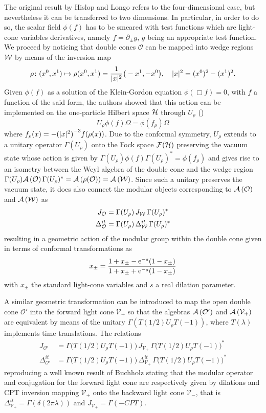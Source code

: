 The original result by Hislop and Longo refers to the 
four-dimensional case, but nevertheless it can be transferred to 
two dimensions. In particular, in order to do so, the scalar
field $\phi(f)$ has to be smeared with test functions 
which are light-cone variables derivatives, namely 
$f=\partial_{\pm} g$, $g$ being an appropriate test 
function. We proceed by noticing that 
double cones $\mathcal{O}$ can be mapped 
into wedge regions $\mathcal{W}$ by means of the inversion map
\[
\rho\colon(x^0,x^1)\mapsto\rho(x^0,x^1)=
\frac{1}{\lvert x\rvert^2}\big(-x^1,-x^0\big),\quad 
\lvert x\rvert^2=(x^0)^2-(x^1)^2.
\]
Given $\phi(f)$ as a solution of the Klein-Gordon equation
$\phi(\Box f)=0$, with $f$ a function of the said form, 
the authors showed that this action can be implemented
on the one-particle Hilbert space $\mathcal{H}$ through $U_{\rho}$
(\cite{HisLon:1982})
\[
U_{\rho}\phi(f)\Omega=\phi(f_{\rho})\Omega
\]
where $f_{\rho}(x)=-{(\lvert x\rvert^2)}^{-3}f(\rho(x))$. Due
to the conformal symmetry, $U_{\rho}$ extends to a unitary
operator $\Gamma(U_{\rho})$ onto the Fock space $\mathcal{F}(\mathcal{H})$ 
preserving the vacuum state whose action is given by
$\Gamma(U_{\rho})\phi(f)\Gamma(U_{\rho})^*=
\phi(f_{\rho})$ and gives rise to 
an isometry between the Weyl algebra of the double cone
and the wedge region $\Gamma(U_{\rho})\mathcal{A}\left(\mathcal{O}\right)
\Gamma(U_{\rho})^*=\mathcal{A}\left(\rho(\mathcal{O})\right)=\mathcal{A}\left(\mathcal{W}\right)$.
Since such a unitary preserves the vacuum state, it does
also connect the modular objects corresponding to
$\mathcal{A}\left(\mathcal{O}\right)$ and $\mathcal{A}\left(\mathcal{W}\right)$ as
\begin{align*}
J_{\mathcal{O}}&=\Gamma(U_{\rho})\,J_{\mathcal{W}}\,\Gamma(U_{\rho})^*\\
\Delta^{it}_{\mathcal{O}}&=\Gamma(U_{\rho})\,\Delta^{it}_{\mathcal{W}}\,
\Gamma(U_{\rho})^*
\end{align*}
resulting in a geometric action of the modular group within
the double cone given in terms of conformal transformations as
\[
x_{\pm}=\frac{1+x_{\pm}-\operatorname{e}^{-s}(1-x_{\pm})}
{1+x_{\pm}+\operatorname{e}^{-s}(1-x_{\pm})}
\]
with $x_{\pm}$ the standard light-cone variables and 
$s$ a real dilation parameter. 

A similar geometric transformation can be introduced to 
map the open double cone $\mathcal{O}'$ into the forward light cone
$\mathcal{V}_+$ so that the algebras $\mathcal{A}\left(\mathcal{O}'\right)$ and 
$\mathcal{A}\left(\mathcal{V}_+\right)$ are equivalent by means of the 
unitary $\Gamma(T(1/2)U_{\rho}T(-1))$, where $T(\lambda)$
implements time translations. The relations
\begin{align*}
J_{\mathcal{O}'}&=\Gamma\big(T(1/2)U_{\rho}T(-1)\big)
\,J_{\mathcal{V}_+}\,\Gamma\big(T(1/2)U_{\rho}T(-1)\big)^*\\
\Delta^{it}_{\mathcal{O}'}&=\Gamma\big(T(1/2)U_{\rho}T(-1)\big)
\,\Delta^{it}_{\mathcal{V}_+}\,
\Gamma\big(T(1/2)U_{\rho}T(-1)\big)^*
\end{align*}
reproducing a well known result of Buchholz \cite{Buchholz:1977} 
stating that the modular operator and conjugation for the 
forward light cone are respectively given by 
dilations and CPT inversion mapping $\mathcal{V}_+$ onto
the backward light cone $\mathcal{V}_-$, that is 
$\Delta_{\mathcal{V}_+}^{it}=\Gamma(\delta(2\pi \lambda))$ and
$J_{\mathcal{V}_+}=\Gamma(-CPT)$.

